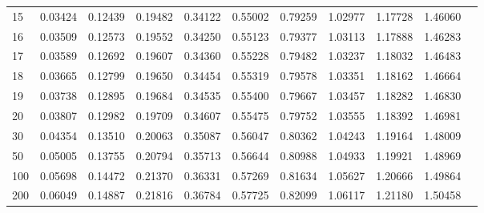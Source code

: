 \begin{tabular}{|g|c|c|c|c|c|c|c|c|c|c|}
    15  & 0.03424  & 0.12439  & 0.19482 & 0.34122  & 0.55002 & 0.79259  & 1.02977 & 1.17728  & 1.46060  \\
    16  & 0.03509  & 0.12573  & 0.19552 & 0.34250  & 0.55123 & 0.79377  & 1.03113 & 1.17888  & 1.46283  \\
    17  & 0.03589  & 0.12692  & 0.19607 & 0.34360  & 0.55228 & 0.79482  & 1.03237 & 1.18032  & 1.46483  \\
    18  & 0.03665  & 0.12799  & 0.19650 & 0.34454  & 0.55319 & 0.79578  & 1.03351 & 1.18162  & 1.46664  \\
    19  & 0.03738  & 0.12895  & 0.19684 & 0.34535  & 0.55400 & 0.79667  & 1.03457 & 1.18282  & 1.46830  \\
    20  & 0.03807  & 0.12982  & 0.19709 & 0.34607  & 0.55475 & 0.79752  & 1.03555 & 1.18392  & 1.46981  \\
    30  & 0.04354  & 0.13510  & 0.20063 & 0.35087  & 0.56047 & 0.80362  & 1.04243 & 1.19164  & 1.48009  \\
    50  & 0.05005  & 0.13755  & 0.20794 & 0.35713  & 0.56644 & 0.80988  & 1.04933 & 1.19921  & 1.48969  \\
    100 & 0.05698  & 0.14472  & 0.21370 & 0.36331  & 0.57269 & 0.81634  & 1.05627 & 1.20666  & 1.49864  \\
    200 & 0.06049  & 0.14887  & 0.21816 & 0.36784  & 0.57725 & 0.82099  & 1.06117 & 1.21180  & 1.50458  \\
    \hline
\end{tabular}